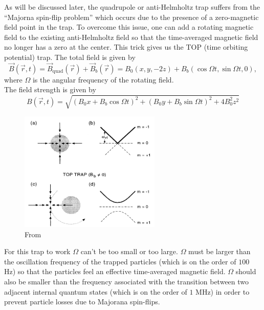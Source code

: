\documentclass{article}
\theoremstyle{definition}
\begin{document}
As will be discussed later, the quadrupole or anti-Helmholtz trap suffers from the ``Majorna spin-flip problem'' which occurs due to the presence of a zero-magnetic field point in the trap. To overcome this issue, one can add a rotating magnetic field to the existing anti-Helmholtz field so that the time-averaged magnetic field no longer has a zero at the center. This trick gives us the TOP (time orbiting potential) trap. The total field is given by 
\begin{equation*}
\vec{B}(\vec{r},t) = \vec{B}_\text{quad}(\vec{r}) + \vec{B}_b(\vec{r}) = B_0 (x,y,-2z) + B_b(\cos\Omega t, \sin\Omega t,0),
\end{equation*} 
where $\Omega$ is the angular frequency of the rotating field. \\


The field strength is given by 
\begin{equation*}
B(\vec{r},t) = \sqrt{(B_0 x + B_b\cos\Omega t)^2 + (B_0 y + B_b\sin\Omega t)^2 + 4 B_0^2 z^2 }
\end{equation*}

\begin{figure}[!htb]
	\centering
	\includegraphics[width=0.6\textwidth]{TOP_trap.png}
	\caption{From \cite{PhysRevLett.74.3352}}
\end{figure}

For this trap to work $\Omega$ can't be too small or too large. $\Omega$ must be larger than the oscillation frequency of the trapped particles (which is on the order of $100$ Hz) so that the particles feel an effective time-averaged magnetic field. $\Omega$ should also be smaller than the frequency associated with the transition between two adjacent internal quantum states (which is on the order of $1$ MHz) in order to prevent particle losses due to Majorana spin-flips. \\
\end{document}
